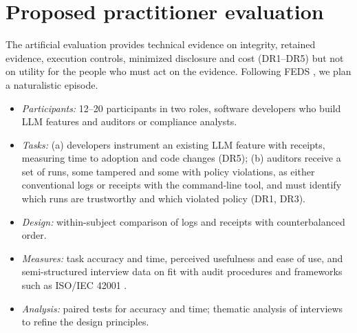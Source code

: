 \section{Proposed practitioner evaluation}\label{app:practitioner-protocol}

The artificial evaluation provides technical evidence on integrity, retained evidence, execution controls, minimized disclosure and cost (DR1--DR5) but not on utility for the people who must act on the evidence. Following FEDS \citep{venable2016}, we plan a naturalistic episode. 
\begin{itemize}
\item \emph{Participants:} 12--20 participants in two roles, software developers who build LLM features and auditors or compliance analysts.
\item \emph{Tasks:} (a) developers instrument an existing LLM feature with receipts, measuring time to adoption and code changes (DR5); (b) auditors receive a set of runs, some tampered and some with policy violations, as either conventional logs or receipts with the command-line tool, and must identify which runs are trustworthy and which violated policy (DR1, DR3).
\item \emph{Design:} within-subject comparison of logs and receipts with counterbalanced order.
\item \emph{Measures:} task accuracy and time, perceived usefulness and ease of use, and semi-structured interview data on fit with audit procedures and frameworks such as ISO/IEC 42001 \citep{iso42001}.
\item \emph{Analysis:} paired tests for accuracy and time; thematic analysis of interviews to refine the design principles.
\end{itemize}

